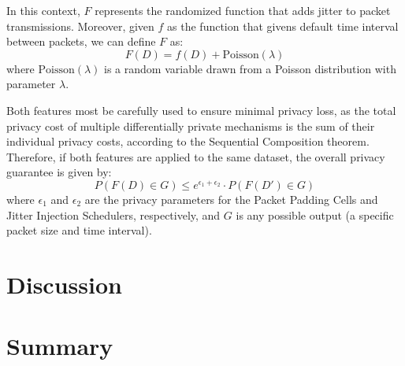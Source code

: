 In this context, $F$ represents the randomized function that adds jitter to packet transmissions. Moreover, given $f$ as the function that givens default time interval between packets, we can define $F$ as:
\[F(D) = f(D) + \text{Poisson}(\lambda)\]
where $\text{Poisson}(\lambda)$ is a random variable drawn from a Poisson distribution with parameter $\lambda$.

Both features most be carefully used to ensure minimal privacy loss, as the total privacy cost of multiple differentially private mechanisms is the sum of their individual privacy costs, according to the Sequential Composition theorem. Therefore, if both features are applied to the same dataset, the overall privacy guarantee is given by:
\[P(F(D) \in G) \leq e^{\epsilon_1 + \epsilon_2} \cdot P(F(D') \in G)\]
where $\epsilon_1$ and $\epsilon_2$ are the privacy parameters for the Packet Padding Cells and Jitter Injection Schedulers, respectively, and $G$ is any possible output (a specific packet size and time interval).

\section{Discussion}\label{sec:validation_discussion}

\section{Summary}\label{sec:validation_summary}

